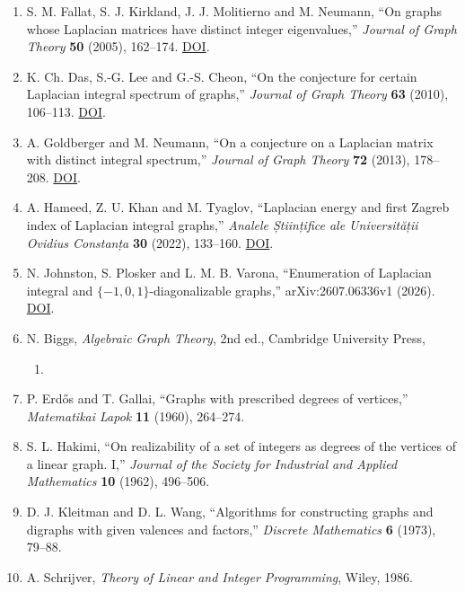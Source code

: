 \documentclass[
  english,
  11pt,
  a4paper,
]{article}
\providecommand{\tightlist}{%
  \setlength{\itemsep}{0pt}\setlength{\parskip}{0pt}}
\begin{document}
\begin{enumerate}
\def\labelenumi{\arabic{enumi}.}
\tightlist
\item
  S. M. Fallat, S. J. Kirkland, J. J. Molitierno and M. Neumann, ``On
  graphs whose Laplacian matrices have distinct integer eigenvalues,''
  \emph{Journal of Graph Theory} \textbf{50} (2005), 162--174.
  \href{https://doi.org/10.1002/jgt.20102}{DOI}.
\item
  K. Ch. Das, S.-G. Lee and G.-S. Cheon, ``On the conjecture for certain
  Laplacian integral spectrum of graphs,'' \emph{Journal of Graph
  Theory} \textbf{63} (2010), 106--113.
  \href{https://doi.org/10.1002/jgt.20412}{DOI}.
\item
  A. Goldberger and M. Neumann, ``On a conjecture on a Laplacian matrix
  with distinct integral spectrum,'' \emph{Journal of Graph Theory}
  \textbf{72} (2013), 178--208.
  \href{https://doi.org/10.1002/jgt.21638}{DOI}.
\item
  A. Hameed, Z. U. Khan and M. Tyaglov, ``Laplacian energy and first
  Zagreb index of Laplacian integral graphs,'' \emph{Analele Științifice
  ale Universității Ovidius Constanța} \textbf{30} (2022), 133--160.
  \href{https://doi.org/10.2478/auom-2022-0023}{DOI}.
\item
  N. Johnston, S. Plosker and L. M. B. Varona, ``Enumeration of
  Laplacian integral and \(\{-1,0,1\}\)-diagonalizable graphs,''
  arXiv:2607.06336v1 (2026).
  \href{https://doi.org/10.48550/arXiv.2607.06336}{DOI}.
\item
  N. Biggs, \emph{Algebraic Graph Theory}, 2nd ed., Cambridge University
  Press,

  \begin{enumerate}
  \def\labelenumii{\arabic{enumii}.}
  \setcounter{enumii}{1992}
  \tightlist
  \item
  \end{enumerate}
\item
  P. Erdős and T. Gallai, ``Graphs with prescribed degrees of
  vertices,'' \emph{Matematikai Lapok} \textbf{11} (1960), 264--274.
\item
  S. L. Hakimi, ``On realizability of a set of integers as degrees of
  the vertices of a linear graph. I,'' \emph{Journal of the Society for
  Industrial and Applied Mathematics} \textbf{10} (1962), 496--506.
\item
  D. J. Kleitman and D. L. Wang, ``Algorithms for constructing graphs
  and digraphs with given valences and factors,'' \emph{Discrete
  Mathematics} \textbf{6} (1973), 79--88.
\item
  A. Schrijver, \emph{Theory of Linear and Integer Programming}, Wiley,
  1986.
\end{enumerate}

\endgroup
\end{document}
